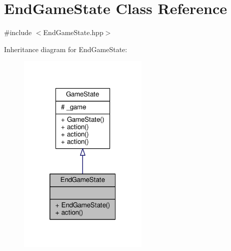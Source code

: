 \hypertarget{class_end_game_state}{\section{End\-Game\-State Class Reference}
\label{class_end_game_state}
}


{\ttfamily \#include $<$End\-Game\-State.\-hpp$>$}



Inheritance diagram for End\-Game\-State\-:
\nopagebreak
\begin{figure}[H]
\begin{center}
\leavevmode
\includegraphics[width=176pt]{class_end_game_state__inherit__graph}
\end{center}
\end{figure}


